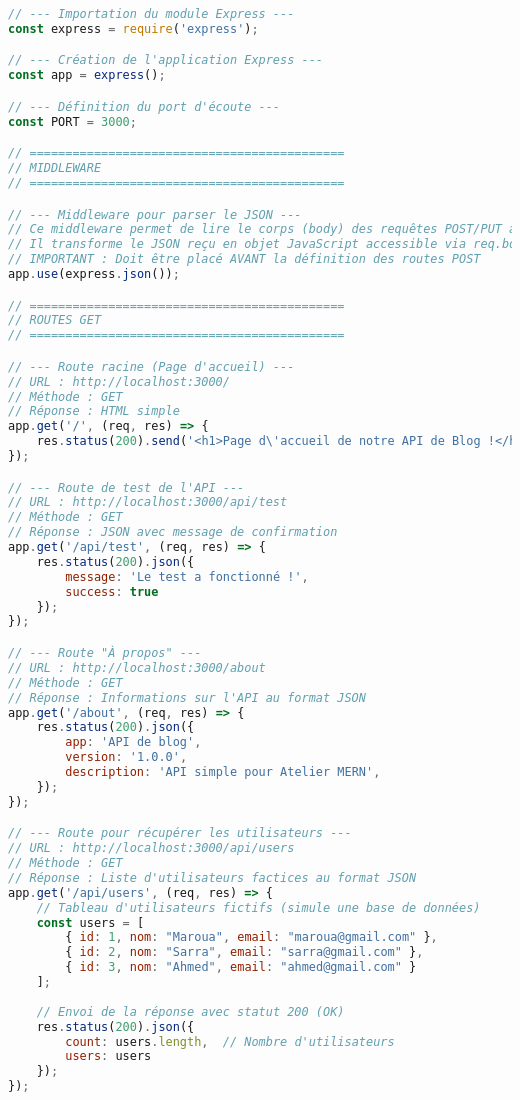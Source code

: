 \documentclass[12pt,a4paper]{article}
\begin{document}
\begin{lstlisting}[language=javascript, caption=Code du serveur Express]
// --- Importation du module Express ---
const express = require('express');

// --- Création de l'application Express ---
const app = express();

// --- Définition du port d'écoute ---
const PORT = 3000;

// ============================================
// MIDDLEWARE
// ============================================

// --- Middleware pour parser le JSON ---
// Ce middleware permet de lire le corps (body) des requêtes POST/PUT au format JSON
// Il transforme le JSON reçu en objet JavaScript accessible via req.body
// IMPORTANT : Doit être placé AVANT la définition des routes POST
app.use(express.json());

// ============================================
// ROUTES GET
// ============================================

// --- Route racine (Page d'accueil) ---
// URL : http://localhost:3000/
// Méthode : GET
// Réponse : HTML simple
app.get('/', (req, res) => {
    res.status(200).send('<h1>Page d\'accueil de notre API de Blog !</h1>');
});

// --- Route de test de l'API ---
// URL : http://localhost:3000/api/test
// Méthode : GET
// Réponse : JSON avec message de confirmation
app.get('/api/test', (req, res) => {
    res.status(200).json({ 
        message: 'Le test a fonctionné !', 
        success: true 
    });
});

// --- Route "À propos" ---
// URL : http://localhost:3000/about
// Méthode : GET
// Réponse : Informations sur l'API au format JSON
app.get('/about', (req, res) => {
    res.status(200).json({
        app: 'API de blog',
        version: '1.0.0',
        description: 'API simple pour Atelier MERN',
    });
});

// --- Route pour récupérer les utilisateurs ---
// URL : http://localhost:3000/api/users
// Méthode : GET
// Réponse : Liste d'utilisateurs factices au format JSON
app.get('/api/users', (req, res) => {
    // Tableau d'utilisateurs fictifs (simule une base de données)
    const users = [
        { id: 1, nom: "Maroua", email: "maroua@gmail.com" },
        { id: 2, nom: "Sarra", email: "sarra@gmail.com" },
        { id: 3, nom: "Ahmed", email: "ahmed@gmail.com" }
    ];
    
    // Envoi de la réponse avec statut 200 (OK)
    res.status(200).json({ 
        count: users.length,  // Nombre d'utilisateurs
        users: users 
    });
});


\end{lstlisting}
\end{document}

